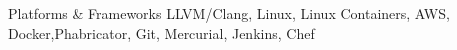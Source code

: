 \begin{cventries}
    \vspace{-0.1em}
    \cvskill
    {Platforms \& Frameworks}
    {LLVM/Clang, Linux, Linux Containers, AWS, Docker,\linebreak Phabricator, Git, Mercurial, Jenkins, Chef}
\end{cventries}

